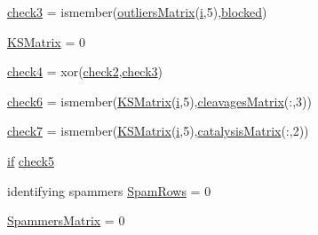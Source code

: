 \begin{DoxyCompactItemize}
\item 
\hyperlink{a00024_adfd17509248a56986475a25ee50fe488}{check3} = ismember(\hyperlink{a00024_a9733b61dd859b1133aa3aa849cf70cbc}{outliers\-Matrix}(\hyperlink{a00065_ad3efca1ea6e3333daf30719ee0501862}{i},5),\hyperlink{a00024_a1faaaae288fc8ca4ed1751049aa2f84f}{blocked})
\item 
\hyperlink{a00024_aea43faf8d3d68de03c645edc96b0c1c0}{K\-S\-Matrix} = 0
\item 
\hyperlink{a00024_ab21c5bac10f7ac73374c002e908df5ac}{check4} = xor(\hyperlink{a00024_a98a8838a85ed24032563a44271b1525a}{check2},\hyperlink{a00024_adfd17509248a56986475a25ee50fe488}{check3})
\item 
\hyperlink{a00024_a0c9b097ea561ab0f23a69197786a243a}{check6} = ismember(\hyperlink{a00024_ab18f9eabd5f873bd17d226d786bc22df}{K\-S\-Matrix}(\hyperlink{a00065_ad3efca1ea6e3333daf30719ee0501862}{i},5),\hyperlink{a00024_a90d1d83fdcae4fb1cba5129d5820d33c}{cleavages\-Matrix}(\-:,3))
\item 
\hyperlink{a00024_a0bbe7d2ceb7b248f0826d069d5a1b735}{check7} = ismember(\hyperlink{a00024_ab18f9eabd5f873bd17d226d786bc22df}{K\-S\-Matrix}(\hyperlink{a00065_ad3efca1ea6e3333daf30719ee0501862}{i},5),\hyperlink{a00024_a244eec8903103b5bbddef461276286ce}{catalysis\-Matrix}(\-:,2))
\item 
\hyperlink{a00024_a01d55766b8058903dd360b4bda71f9f5}{if} \hyperlink{a00024_abee07c73829351d18ba356c86e3e096d}{check5}
\item 
identifying spammers \hyperlink{a00024_aa9cffa4c2d9962c67a719b05a414e478}{Spam\-Rows} = 0
\item 
\hyperlink{a00024_af1801174c9397e7fad0394203f120c31}{Spammers\-Matrix} = 0
\end{DoxyCompactItemize}


